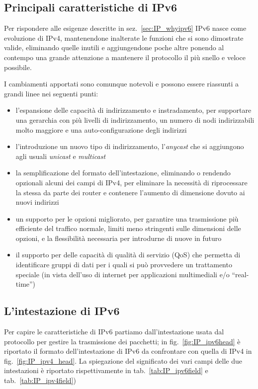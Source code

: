 \subsection{Principali caratteristiche di IPv6}
\label{sec:IP_ipv6over}

Per rispondere alle esigenze descritte in sez.~\ref{sec:IP_whyipv6} IPv6 nasce
come evoluzione di IPv4, mantenendone inalterate le funzioni che si sono
dimostrate valide, eliminando quelle inutili e aggiungendone poche altre
ponendo al contempo una grande attenzione a mantenere il protocollo il più
snello e veloce possibile.

I cambiamenti apportati sono comunque notevoli e possono essere riassunti a
grandi linee nei seguenti punti:
\begin{itemize}
\item l'espansione delle capacità di indirizzamento e instradamento, per
  supportare una gerarchia con più livelli di indirizzamento, un numero di
  nodi indirizzabili molto maggiore e una auto-configurazione degli indirizzi
\item l'introduzione un nuovo tipo di indirizzamento, l'\textit{anycast} che
  si aggiungono agli usuali \textit{unicast} e \textit{multicast}
\item la semplificazione del formato dell'intestazione, eliminando o rendendo
  opzionali alcuni dei campi di IPv4, per eliminare la necessità di
  riprocessare la stessa da parte dei router e contenere l'aumento di
  dimensione dovuto ai nuovi indirizzi
\item un supporto per le opzioni migliorato, per garantire una trasmissione
  più efficiente del traffico normale, limiti meno stringenti sulle
  dimensioni delle opzioni, e la flessibilità necessaria per introdurne di
  nuove in futuro
\item il supporto per delle capacità di qualità di servizio (QoS) che
  permetta di identificare gruppi di dati per i quali si può provvedere un
  trattamento speciale (in vista dell'uso di internet per applicazioni
  multimediali e/o ``real-time'')
\end{itemize}


\subsection{L'intestazione di IPv6}
\label{sec:IP_ipv6head}

Per capire le caratteristiche di IPv6 partiamo dall'intestazione usata dal
protocollo per gestire la trasmissione dei pacchetti; in
fig.~\ref{fig:IP_ipv6head} è riportato il formato dell'intestazione di IPv6 da
confrontare con quella di IPv4 in fig.~\ref{fig:IP_ipv4_head}. La spiegazione
del significato dei vari campi delle due intestazioni è riportato
rispettivamente in tab.~\ref{tab:IP_ipv6field} e tab.~\ref{tab:IP_ipv4field})

